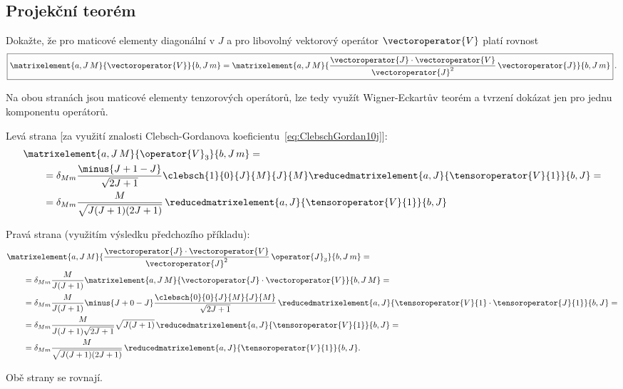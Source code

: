 \subsection{Projekční teorém}
	Dokažte, že pro maticové elementy diagonální v $J$ a pro libovolný vektorový operátor $\vectoroperator{V}$ platí rovnost
	\begin{equation}
		\label{eq:ProjectionTheorem}
		\boxed{
			\matrixelement{a,J\,M}{\vectoroperator{V}}{b,J\,m}=\matrixelement{a,J\,M}{\frac{\vectoroperator{J}\cdot\vectoroperator{V}}{\vectoroperator{J}^{2}}\,\vectoroperator{J}}{b,J\,m}
		}\,.
	\end{equation}

\begin{solution}
    Na obou stranách jsou maticové elementy tenzorových operátorů, lze tedy využít Wigner-Eckartův teorém a tvrzení dokázat jen pro jednu komponentu operátorů.

	Levá strana [za využití znalosti Clebsch-Gordanova koeficientu~\eqref{eq:ClebschGordan10j}]:
	\begin{align}
		&\matrixelement{a,J\,M}{\operator{V}_{3}}{b,J\,m}=\nonumber\\
		&\qquad=\delta_{Mm}\frac{\minus{J+1-J}}{\sqrt{2J+1}}\clebsch{1}{0}{J}{M}{J}{M}\reducedmatrixelement{a,J}{\tensoroperator{V}{1}}{b,J}=\nonumber\\
		&\qquad=\delta_{Mm}\frac{M}{\sqrt{J(J+1)(2J+1)}}\,\reducedmatrixelement{a,J}{\tensoroperator{V}{1}}{b,J}
	\end{align}
	
	Pravá strana (využitím výsledku předchozího příkladu):
	\begin{align}
		&\matrixelement{a,J\,M}{\frac{\vectoroperator{J}\cdot\vectoroperator{V}}{\vectoroperator{J}^{2}}\,\operator{J}_{3}}{b,J\,m}=\nonumber\\
		&\qquad=\delta_{Mm}\frac{M}{J(J+1)}\matrixelement{a,J\,M}{\vectoroperator{J}\cdot\vectoroperator{V}}{b,J\,M}=\nonumber\\
		&\qquad=\delta_{Mm}\frac{M}{J(J+1)}\minus{J+0-J}\frac{\clebsch{0}{0}{J}{M}{J}{M}}{\sqrt{2J+1}}\,\reducedmatrixelement{a,J}{\tensoroperator{V}{1}\cdot\tensoroperator{J}{1}}{b,J}=\nonumber\\
		&\qquad=\delta_{Mm}\frac{M}{J(J+1)\sqrt{2J+1}}\sqrt{J(J+1)}\,\reducedmatrixelement{a,J}{\tensoroperator{V}{1}}{b,J}=\nonumber\\
		&\qquad=\delta_{Mm}\frac{M}{\sqrt{J(J+1)(2J+1)}}\,\reducedmatrixelement{a,J}{\tensoroperator{V}{1}}{b,J}.
	\end{align}

	Obě strany se rovnají.
\end{solution}
